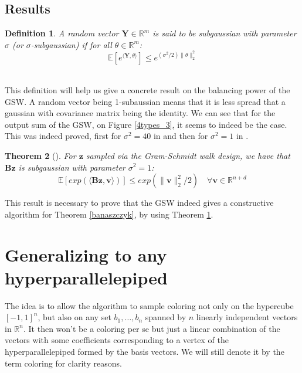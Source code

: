 \documentclass[12pt]{article}
\newtheorem{theorem}{Theorem}
\newtheorem{definition}[theorem]{Definition}
\begin{document}
\subsection{Results}
\begin{definition}
A random vector $\textbf{Y} \in \mathbb{R}^m$ is said to be subgaussian with parameter $\sigma$ (or $\sigma$-subgaussian) if for all $\theta \in \mathbb{R}^m$:
$$\mathbb{E}[e^{\langle\textbf{Y},\theta\rangle}]\leq e^{(\sigma^2/2)\|\theta\|_2^2}$$ \\
\end{definition}
This definition will help us give a concrete result on the balancing power of the GSW. A random vector being 1-subaussian means that it is less spread that a gaussian with covariance matrix being the identity. We can see that for the output sum of the GSW, on Figure \ref{4types_3}, it seems to indeed be the case. This was indeed proved, first for $\sigma^2=40$ in \cite{blues} and then for $\sigma^2=1$ in \cite{harshaw2019balancing}.
\begin{theorem}[\cite{harshaw2019balancing}]
    For $\textbf{z}$ sampled via the Gram-Schmidt walk design, we have that $\textbf{Bz}$ is subgaussian with parameter $\sigma^2=1$:$$\mathbb{E}[exp(\langle\textbf{Bz},\textbf{v}\rangle)]\leq exp(\|\textbf{v}\|^2_2/2)\quad\forall\textbf{v}\in\mathbb{R}^{n+d}$$
\end{theorem}
This result is necessary to prove that the GSW indeed gives a constructive algorithm for Theorem \ref{banaszczyk}, by using Theorem \ref{}. 
\section{Generalizing to any hyperparallelepiped}
The idea is to allow the algorithm to sample coloring not only on the hypercube $[-1,1]^n$, but also on any set $b_1,\dots, b_n$ spanned by $n$ linearly independent vectors in $\mathbb{R}^n$. It then won't be a coloring per se but just a linear combination of the vectors with some coefficients corresponding to a vertex of the hyperparallelepiped formed by the basis vectors. We will still denote it by the term coloring for clarity reasons.
\end{document}
